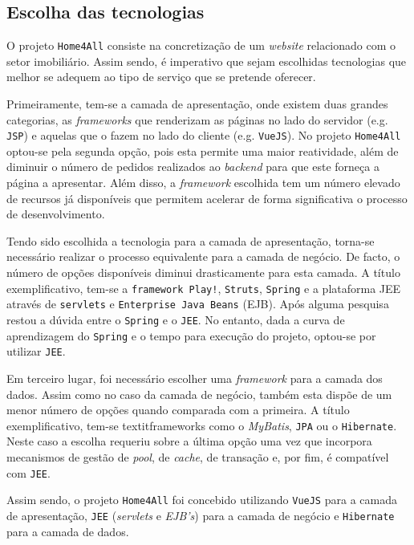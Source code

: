 \subsection{Escolha das tecnologias}

O projeto \texttt{Home4All} consiste na concretização de um \textit{website} relacionado com o setor imobiliário. Assim sendo, é imperativo que sejam escolhidas tecnologias que melhor se adequem ao tipo de serviço que se pretende oferecer. 

Primeiramente, tem-se a camada de apresentação, onde existem duas grandes categorias, as \textit{frameworks} que renderizam as páginas no lado do servidor (e.g. \texttt{JSP}) e aquelas que o fazem no lado do cliente (e.g. \texttt{VueJS}). No projeto \texttt{Home4All} optou-se pela segunda opção, pois esta permite uma maior reatividade, além de diminuir o número de pedidos realizados ao \textit{backend} para que este forneça a página a apresentar. Além disso, a \textit{framework} escolhida tem um número elevado de recursos já disponíveis que permitem acelerar de forma significativa o processo de desenvolvimento.

Tendo sido escolhida a tecnologia para a camada de apresentação, torna-se necessário realizar o processo equivalente para a camada de negócio. De facto, o número de opções disponíveis diminui drasticamente para esta camada. A título exemplificativo, tem-se a \texttt{framework Play!}, \texttt{Struts}, \texttt{Spring} e a plataforma JEE através de \texttt{servlets} e \texttt{Enterprise Java Beans} (EJB). Após alguma pesquisa restou a dúvida entre o \texttt{Spring} e o \texttt{JEE}. No entanto, dada a curva de aprendizagem do \texttt{Spring} e o tempo para execução do projeto, optou-se por utilizar \texttt{JEE}.

Em terceiro lugar, foi necessário escolher uma \textit{framework} para a camada dos dados. Assim como no caso da camada de negócio, também esta dispõe de um menor número de opções quando comparada com a primeira. A título exemplificativo, tem-se textit{frameworks} como o \textit{MyBatis}, \texttt{JPA} ou o \texttt{Hibernate}. Neste caso a escolha requeriu sobre a última opção uma vez que incorpora mecanismos de gestão de \textit{pool}, de \textit{cache}, de transação e, por fim, é compatível com \texttt{JEE}. 

Assim sendo, o projeto \texttt{Home4All} foi concebido utilizando \texttt{VueJS} para a camada de apresentação, \texttt{JEE} (\textit{servlets} e \textit{EJB's}) para a camada de negócio e \texttt{Hibernate} para a camada de dados.

